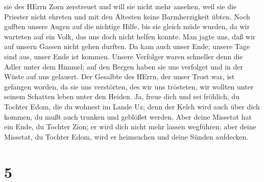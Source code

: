 sie des HErrn Zorn zerstreuet und will sie nicht mehr ansehen, weil sie
die Priester nicht ehreten und mit den Ältesten keine Barmherzigkeit
übten.  Noch gafften unsere Augen auf die nichtige Hilfe,
bis sie gleich müde wurden, da wir warteten auf ein Volk, das uns doch
nicht helfen konnte.  Man jagte uns, daß wir auf unsern
Gassen nicht gehen durften. Da kam auch unser Ende; unsere Tage sind
aus, unser Ende ist kommen.  Unsere Verfolger waren
schneller denn die Adler unter dem Himmel; auf den Bergen haben sie uns
verfolget und in der Wüste auf uns gelauert.  Der Gesalbte
des HErrn, der unser Trost war, ist gefangen worden, da sie uns
verstörten, des wir uns trösteten, wir wollten unter seinem Schatten
leben unter den Heiden.  Ja, freue dich und sei fröhlich,
du Tochter Edom, die du wohnest im Lande Uz; denn der Kelch wird auch
über dich kommen, du mußt auch trunken und geblößet werden.
 Aber deine Missetat hat ein Ende, du Tochter Zion; er wird
dich nicht mehr lassen wegführen; aber deine Missetat, du Tochter Edom,
wird er heimsuchen und deine Sünden aufdecken.

\hypertarget{section-4}{%
\section{5}\label{section-4}}

